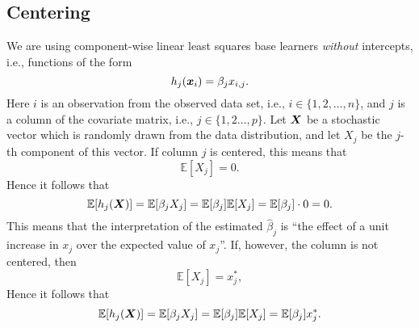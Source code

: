 \subsection{Centering}
We are using component-wise linear least squares base learners \textit{without} intercepts, i.e., functions of the form
\begin{equation*}
    h_j(\bm{x}_i)=\beta_jx_{i,j}.
\end{equation*}
Here $i$ is an observation from the observed data set, i.e., $i\in\{1,2,\ldots,n\}$, and $j$ is a column of the covariate matrix, i.e., $j\in\{1,2\ldots,p\}$.
Let $\bm{X}$ be a stochastic vector which is randomly drawn from the data distribution, and let $X_j$ be the $j$-th component of this vector.
If column $j$ is centered, this means that
\begin{equation*}
    \mathbb{E}[X_j]=0.
\end{equation*}
Hence it follows that
\begin{equation*}
    \mathbb{E}[h_j(\bm{X})]=\mathbb{E}[\beta_jX_{j}]=\mathbb{E}[\beta_j]\mathbb{E}[X_j]=\mathbb{E}[\beta_j]\cdot0=0.
\end{equation*}
This means that the interpretation of the estimated $\hat{\beta}_j$ is ``the effect of a unit increase in $x_j$ over the expected value of $x_j$''.
If, however, the column is not centered, then
\begin{equation*}
    \mathbb{E}[X_j]=x_j^*,
\end{equation*}
Hence it follows that
\begin{equation*}
    \mathbb{E}[h_j(\bm{X})]=\mathbb{E}[\beta_jX_{j}]=\mathbb{E}[\beta_j]\mathbb{E}[X_j]=\mathbb{E}[\beta_j]x_j^*.
\end{equation*}